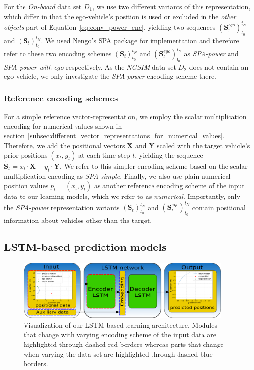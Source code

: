 For the \emph{On-board} data set $D_1$, we use two different variants of this representation, which differ in that the ego-vehicle's position is used or excluded in the \emph{other objects} part of Equation~\eqref{eq:conv_power_enc}, yielding two sequences $(\mathbf{S}_{t}^{ego})_{t_0}^{t_N}$ and $(\mathbf{S}_{t})_{t_0}^{t_N}$.
We used \acs{Nengo}'s \ac{SPA} package for implementation and therefore refer to these two encoding schemes $(\mathbf{S}_{t})_{t_0}^{t_N}$ and $(\mathbf{S}_{t}^{ego})_{t_0}^{t_N}$ as \emph{\ac{SPA}-power} and \emph{\ac{SPA}-power-with-ego} respectively.
As the \emph{\ac{NGSIM}} data set $D_2$ does not contain an ego-vehicle, we only investigate the \emph{\ac{SPA}-power} encoding scheme there.

\subsubsection{Reference encoding schemes}%
\label{ssubsec:reference_encoding_schemes}

For a simple reference vector-representation, we employ the scalar multiplication encoding for numerical values shown in section~\ref{subsec:different_vector_representations_for_numerical_values}.
Therefore, we add the positional vectors $\mathbf{X}$ and $\mathbf{Y}$ scaled with the target vehicle's prior positions $(x_{t}, y_{t})$ at each time step $t$, yielding the sequence $\tilde{\mathbf{S}}_{t} =  x_{t} \cdot \mathbf{X} + y_{t}\cdot \mathbf{Y}$.
We refer to this simpler encoding scheme based on the scalar multiplication encoding as \emph{\ac{SPA}-simple}.
Finally, we also use plain numerical position values $p_t = (x_{t}, y_{t})$ as another reference encoding scheme of the input data to our learning models, which we refer to as \emph{numerical}.
Importantly, only the \emph{\ac{SPA}-power} representation variants $(\mathbf{S}_{t})_{t_0}^{t_N}$ and $(\mathbf{S}_{t}^{ego})_{t_0}^{t_N}$ contain positional information about vehicles other than the target.

\subsection{\acs{LSTM}-based prediction models}%
\label{subsec:lstm_based_prediction_models}

\begin{figure}[t!]
  \centering
  \includegraphics[width=0.95\textwidth]{imgs/lstm_arch.eps}
  \caption{Visualization of our \ac{LSTM}-based learning architecture. Modules that change with varying encoding scheme of the input data are highlighted through dashed red borders whereas parts that change when varying the data set are highlighted through dashed blue borders.}\label{fig:lstm_arch}
\end{figure}

